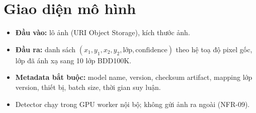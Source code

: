 \section{Giao diện mô hình}
\label{sec:modeliface}
\begin{itemize}
  \item \textbf{Đầu vào:} lô ảnh (URI Object Storage), kích thước ảnh.
  \item \textbf{Đầu ra:} danh sách \((x_1, y_1, x_2, y_2, \text{lớp}, \text{confidence})\)
        theo hệ toạ độ pixel gốc, lớp đã ánh xạ sang 10 lớp BDD100K.
  \item \textbf{Metadata bắt buộc:} model name, version, checksum artifact, mapping
        lớp version, thiết bị, batch size, thời gian suy luận.
  \item Detector chạy trong GPU worker nội bộ; không gửi ảnh ra ngoài (NFR-09).
\end{itemize}
